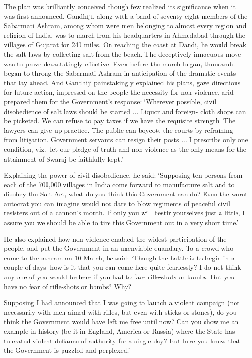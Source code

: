 \begin{multicols}{2}
The plan was brilliantly conceived though few realized its significance when it was first announced. Gandhiji, along with a band of seventy-eight members of the Sabarmati Ashram, among whom were men belonging to almost every region and religion of India, was to march from his headquarters in Ahmedabad through the villages of Gujarat for 240 miles. On reaching the coast at Dandi, he would break the salt laws by collecting salt from the beach. The deceptively innocuous move was to prove devastatingly effective. Even before the march began, thousands began to throng the Sabarmati Ashram in anticipation of the dramatic events that lay ahead. And Gandhiji painstakingly explained his plans, gave directions for future action, impressed on the people the necessity for non-violence, arid prepared them for the Government's response: `Wherever possible, civil disobedience of salt laws should be started ... Liquor and foreign- cloth shops can be picketed. We can refuse to pay taxes if we have the requisite strength. The lawyers can give up practice. The public can boycott the courts by refraining from litigation. Government servants can resign their posts ... I prescribe only one condition, viz., let our pledge of truth and non-violence as the only means for the attainment of Swaraj be faithfully kept.'

Explaining the power of civil disobedience, he said: `Supposing ten persons from each of the 700,000 villages in India come forward to manufacture salt and to disobey the Salt Act, what do you think this Government can do? Even the worst autocrat you can imagine would not dare to blow regiments of peaceful civil resisters out of a cannon's mouth. If only you will bestir yourselves just a little, I assure you we should be able to tire this Government out in a very short time.'

He also explained how non-violence enabled the widest participation of the people, and put the Government in an unenviable quandary. To a crowd who came to the ashram on 10 March, he said: `Though the battle is to begin in a couple of days, how is it that you can come here quite fearlessly? I do not think any one of you would be here if you had to face rifle-shots or bombs. But you have no fear of rifle-shots or bombs? Why?

Supposing I had announced that I was going to launch a violent campaign (not necessarily with men aimed with rifles, but even with sticks or stones), do you think the Government would have left me free until now? Can you show me an example in history (be it in England, America or Russia) where the State has tolerated violent defiance of authority for a single day? But here you know that the Government is puzzled and perplexed.'


\end{multicols}
